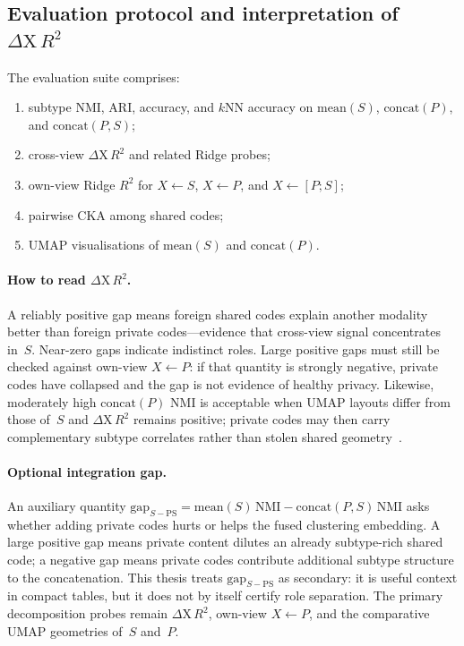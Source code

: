 \subsection{Evaluation protocol and interpretation of $\Delta\mathrm{X}\,R^{2}$}

The evaluation suite comprises:
\begin{enumerate}
\item subtype NMI, ARI, accuracy, and $k$NN accuracy on $\mathrm{mean}(S)$, $\mathrm{concat}(P)$, and $\mathrm{concat}(P,S)$;
\item cross-view $\Delta\mathrm{X}\,R^{2}$ and related Ridge probes;
\item own-view Ridge $R^{2}$ for $X\leftarrow S$, $X\leftarrow P$, and $X\leftarrow[P;S]$;
\item pairwise CKA among shared codes;
\item UMAP visualisations of $\mathrm{mean}(S)$ and $\mathrm{concat}(P)$.
\end{enumerate}

\paragraph{How to read $\Delta\mathrm{X}\,R^{2}$.}
A reliably positive gap means foreign shared codes explain another modality better than foreign private codes---evidence that cross-view signal concentrates in~$S$. Near-zero gaps indicate indistinct roles. Large positive gaps must still be checked against own-view $X\leftarrow P$: if that quantity is strongly negative, private codes have collapsed and the gap is not evidence of healthy privacy. Likewise, moderately high $\mathrm{concat}(P)$ NMI is acceptable when UMAP layouts differ from those of~$S$ and $\Delta\mathrm{X}\,R^{2}$ remains positive; private codes may then carry complementary subtype correlates rather than stolen shared geometry~\citep{levine2013integrated}.

\paragraph{Optional integration gap.}
An auxiliary quantity $\mathrm{gap}_{S-\mathrm{PS}}=\mathrm{mean}(S)\,\mathrm{NMI}-\mathrm{concat}(P,S)\,\mathrm{NMI}$ asks whether adding private codes hurts or helps the fused clustering embedding. A large positive gap means private content dilutes an already subtype-rich shared code; a negative gap means private codes contribute additional subtype structure to the concatenation. This thesis treats $\mathrm{gap}_{S-\mathrm{PS}}$ as secondary: it is useful context in compact tables, but it does not by itself certify role separation. The primary decomposition probes remain $\Delta\mathrm{X}\,R^{2}$, own-view $X\leftarrow P$, and the comparative UMAP geometries of~$S$ and~$P$.

